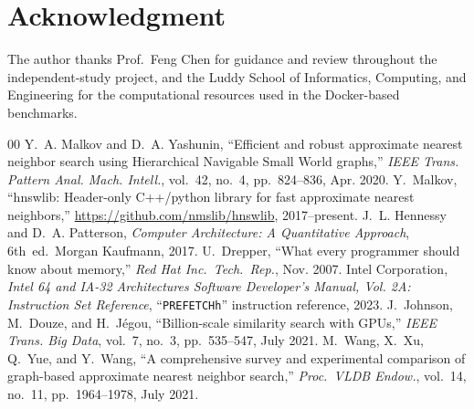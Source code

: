 \documentclass[conference]{IEEEtran}
\begin{document}
\section*{Acknowledgment}
The author thanks Prof.\ Feng Chen for guidance and review throughout the
independent-study project, and the Luddy School of Informatics, Computing,
and Engineering for the computational resources used in the Docker-based
benchmarks.

\begin{thebibliography}{00}
 Y.~A. Malkov and D.~A. Yashunin, ``Efficient and robust
approximate nearest neighbor search using Hierarchical Navigable Small World
graphs,'' \emph{IEEE Trans. Pattern Anal. Mach. Intell.}, vol.~42, no.~4,
pp.~824--836, Apr. 2020.
 Y.~Malkov, ``hnswlib: Header-only C++/python library for
fast approximate nearest neighbors,''
\url{https://github.com/nmslib/hnswlib}, 2017--present.
 J.~L. Hennessy and D.~A. Patterson, \emph{Computer
Architecture: A Quantitative Approach}, 6th~ed.\ Morgan Kaufmann, 2017.
 U.~Drepper, ``What every programmer should know about
memory,'' \emph{Red Hat Inc.\ Tech.\ Rep.}, Nov. 2007.
 Intel Corporation, \emph{Intel 64 and IA-32
Architectures Software Developer's Manual, Vol. 2A: Instruction Set
Reference}, ``\texttt{PREFETCHh}'' instruction reference, 2023.
 J.~Johnson, M.~Douze, and H.~J\'egou, ``Billion-scale
similarity search with GPUs,'' \emph{IEEE Trans. Big Data}, vol.~7, no.~3,
pp.~535--547, July 2021.
 M.~Wang, X.~Xu, Q.~Yue, and Y.~Wang, ``A
comprehensive survey and experimental comparison of graph-based approximate
nearest neighbor search,'' \emph{Proc.\ VLDB Endow.}, vol.~14, no.~11,
pp.~1964--1978, July 2021.
\end{thebibliography}
\end{document}

